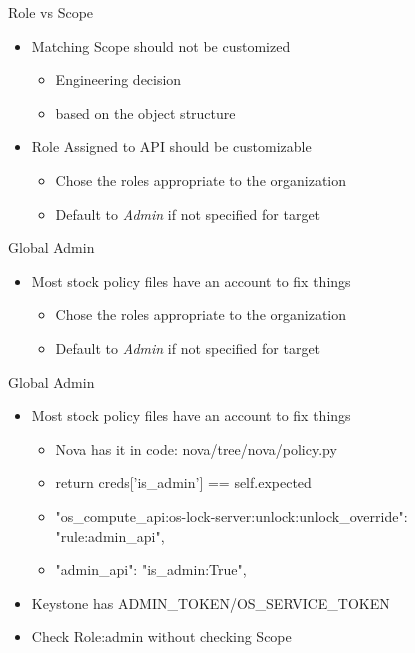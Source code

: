 \documentclass{beamer}
\begin{document}
\begin{frame}{Role vs Scope}
  \begin{itemize}
  \item Matching Scope should not be customized
    \begin{itemize}
    \item  Engineering decision
    \item  based on the object structure
    \end{itemize}
  \item Role Assigned to API should be customizable
    \begin{itemize}
    \item Chose the roles appropriate to the organization
    \item Default to \textit{Admin} if not specified for target
    \end{itemize}
  \end{itemize}
\end{frame}
  

\begin{frame}{Global Admin}
  \begin{itemize}
  \item Most stock policy files have an account to fix things
   \begin{itemize}
    \item Chose the roles appropriate to the organization
    \item Default to \textit{Admin} if not specified for target
    \end{itemize}
  \end{itemize}
\end{frame}
  

\begin{frame}{Global Admin}
  \begin{itemize}
  \item Most stock policy files have an account to fix things
    \begin{itemize}
    \item Nova has it in code: nova/tree/nova/policy.py
    \item return creds['is\_admin'] == self.expected
    \item "os\_compute\_api:os-lock-server:unlock:unlock\_override": "rule:admin\_api",
    \item "admin\_api": "is\_admin:True",
    \end {itemize}
  \item Keystone has  ADMIN\_TOKEN/OS\_SERVICE\_TOKEN
  \item Check Role:admin without checking Scope
  \end{itemize}
\end{frame}
\end{document}

